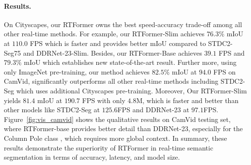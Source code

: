 \documentclass{article}
\begin{document}
\vspace{-2mm}
\paragraph{Results.} On Cityscapes\cite{Cityscapes}, our RTFormer owns the best speed-accuracy trade-off among all other real-time methods. For example, our RTFormer-Slim achieves $76.3\%$ mIoU at $110.0$ FPS which is faster and provides better mIoU compared to STDC2-Seg75\cite{fan2021rethinking} and DDRNet-23-Slim\cite{fu2019dual}. Besides, our RTFormer-Base achieves $39.1$ FPS and $79.3\%$ mIoU which establishes new state-of-the-art result. Further more, using only ImageNet\cite{deng2009imagenet} pre-training, our method achieves $82.5\%$ mIoU at $94.0$ FPS on CamVid\cite{CamVid}, significantly outperforms all other real-time methods including STDC2-Seg\cite{fan2021rethinking} which uses additional Cityscapes\cite{Cityscapes} pre-training. Moreover, Our RTFormer-Slim yields $81.4$ mIoU at $190.7$ FPS with only $4.8$M, which is faster and better than other models like STDC2-Seg\cite{fan2021rethinking} at $125.6$FPS and DDRNet-23\cite{hong2021deep} at $97.1$FPS. Figure~\ref{fig:vis_camvid} shows the qualitative results on CamVid\cite{CamVid} testing set, where RTFormer-base provides better detail than DDRNet-23\cite{hong2021deep}, especially for the Column Pole class , which requires more global context. In summary, these results demonstrate the superiority of RTFormer in real-time semantic segmentation in terms of accuracy, latency, and model size.
\end{document}
